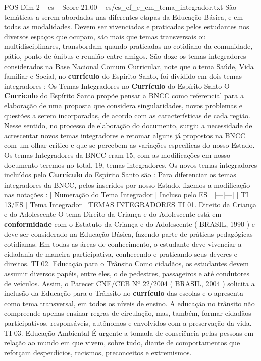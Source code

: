 \begin{textsample}{POS Dim 2 – es – Score 21.00 – es/es\_ef\_e\_em\_tema\_integrador.txt}
São temáticas a serem abordadas nas diferentes etapas da Educação Básica, e em todas as modalidades.
Devem ser vivenciadas e praticadas pelos estudantes nos diversos espaços que ocupam, são mais que temas transversais ou multidisciplinares, transbordam quando praticadas no cotidiano da comunidade, pátio, ponto de ônibus e reunião entre amigos.
São doze os temas integradores considerados na Base Nacional Comum Curricular, note que o tema Saúde, Vida familiar e Social, no \textbf{currículo} do Espírito Santo, foi dividido em dois temas integradores : Os Temas Integradores no \textbf{Currículo} do Espírito Santo O \textbf{Currículo} do Espírito Santo propõe pensar a BNCC como referencial para a elaboração de uma proposta que considera singularidades, novos problemas e questões a serem incorporadas, de acordo com as características de cada região.
Nesse sentido, no processo de elaboração do documento, surgiu a necessidade de acrescentar novos temas integradores e retomar alguns já propostos na BNCC com um olhar crítico e que se percebem as variações específicas do nosso Estado.
Os temas Integradores da BNCC eram 15, com as modificações em nosso documento teremos no total, 19, temas integradores.
Os novos temas integradores incluídos pelo \textbf{Currículo} do Espírito Santo são : Para diferenciar os temas integradores da BNCC, pelos inseridos por nosso Estado, fizemos a modificação nas notações : | Numeração do Tema Integrador | Incluso pelo ES | |---|---| | TI 13/ES | Tema Integrador | TEMAS INTEGRADORES TI 01.
Direito da Criança e do Adolescente O tema Direito da Criança e do Adolescente está em \textbf{conformidade} com o Estatuto da Criança e do Adolescente ( BRASIL, 1990 ) e deve ser considerado na Educação Básica, fazendo parte de práticas pedagógicas cotidianas.
Em todas as áreas de conhecimento, o estudante deve vivenciar a cidadania de maneira participativa, conhecendo e praticando seus deveres e direitos.
TI 02.
Educação para o Trânsito Como cidadãos, os estudantes devem assumir diversos papéis, entre eles, o de pedestres, passageiros e até condutores de veículos.
Assim, o Parecer CNE/CEB Nº 22/2004 ( BRASIL, 2004 ) solicita a inclusão da Educação para o Trânsito no \textbf{currículo} das escolas e o apresenta como tema transversal, em todos os níveis de ensino.
A educação no trânsito não compreende apenas ensinar regras de circulação, mas, também, formar cidadãos participativos, responsáveis, autônomos e envolvidos com a preservação da vida.
TI 03.
Educação Ambiental É urgente a tomada de consciência pelas pessoas em relação ao mundo em que vivem, sobre tudo, diante de comportamentos que reforçam desperdícios, racismos, preconceitos e extremismos.

\end{textsample}

